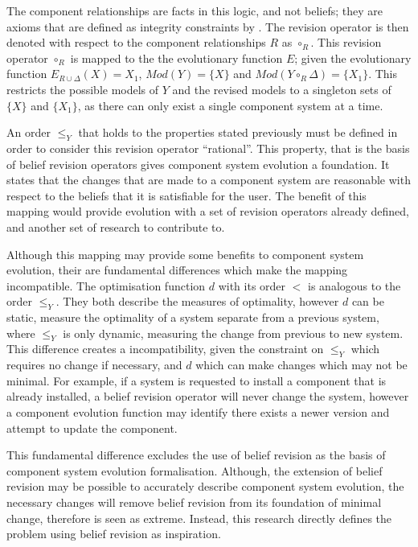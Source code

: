 The component relationships are facts in this logic, and not beliefs; they are axioms that are defined as integrity constraints by \cite{katsuno1991propositional}.
The revision operator is then denoted with respect to the component relationships $R$ as $\circ_R$.
This revision operator $\circ_R$ is mapped to the the evolutionary function $E$;
given the evolutionary function $E_{R \cup \Delta}(X) = X_1$, $Mod(Y) = \{X\}$ and $Mod(Y \circ_R \Delta) = \{X_1\}$.
This restricts the possible models of $Y$ and the revised models to a singleton sets of $\{X\}$ and $\{X_1\}$,
as there can only exist a single component system at a time.

An order $\leq_{Y}$ that holds to the properties stated previously must be defined in order to consider this revision operator ``rational''.
This property, that is the basis of belief revision operators gives component system evolution a foundation.
It states that the changes that are made to a component system are reasonable with respect to the beliefs that it is satisfiable for the user.
The benefit of this mapping would provide evolution with a set of revision operators already defined, and another set of research to contribute to.

Although this mapping may provide some benefits to component system evolution, their are fundamental differences which make the mapping incompatible.
The optimisation function $d$ with its order $<$ is analogous to the order $\leq_{Y}$.
They both describe the measures of optimality, however $d$ can be static, measure the optimality of a system separate from a previous system,
where $\leq_Y$ is only dynamic, measuring the change from previous to new system.
This difference creates a incompatibility, given the constraint on $\leq_Y$ which requires no change if necessary,
and $d$ which can make changes which may not be minimal.
For example, if a system is requested to install a component that is already installed, a belief revision operator will never change the system,
however a component evolution function may identify there exists a newer version and attempt to update the component.

This fundamental difference excludes the use of belief revision as the basis of component system evolution formalisation.
Although, the extension of belief revision may be possible to accurately describe component system evolution, 
the necessary changes will remove belief revision from its foundation of minimal change,
therefore is seen as extreme.
Instead, this research directly defines the problem using belief revision as inspiration.

